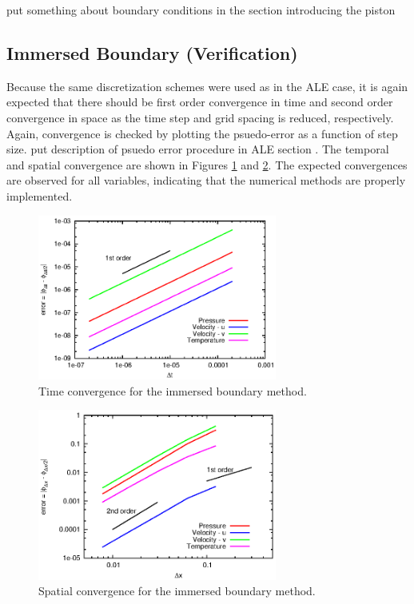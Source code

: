 \documentclass{article}
\begin{document}
\color{red}put something about boundary conditions in the section introducing the piston \color{black} \\

\subsection{Immersed Boundary (Verification)}

Because the same discretization schemes were used as in the ALE case, it is again expected that there should be first order convergence in time and second order convergence in space as the time step and grid spacing is reduced, respectively. Again, convergence is checked by plotting the psuedo-error as a function of step size. \color{red} put description of psuedo error procedure in ALE section \color{black}. The temporal and spatial convergence are shown in Figures \ref{fig:timeconvib} and \ref{fig:spaceconvib}. The expected convergences are observed for all variables, indicating that the numerical methods are properly implemented. \\

\begin{figure}
    \centering
    \includegraphics[width=0.7\textwidth]{timeconvib.eps}         
    \caption{Time convergence for the immersed boundary method.}
    \label{fig:timeconvib}
  \end{figure}
\begin{figure}
    \centering
    \includegraphics[width=0.7\textwidth]{spaceconvib.eps}         
    \caption{Spatial convergence for the immersed boundary method.}
    \label{fig:spaceconvib}
  \end{figure}
\end{document}
